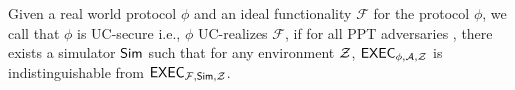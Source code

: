 
\begin{definition} \label{def:uc}
	Given a real world protocol $ \phi $ and an ideal functionality $ \mathcal{F} $ for the protocol $ \phi $, we call that $ \phi $ is UC-secure i.e., $ \phi $ UC-realizes $ \mathcal{F} $, if for all PPT adversaries \adv,  there exists a simulator $ \mathsf{Sim}  $ such that for any environment $ \mathcal{Z} $,
	$\mathsf{EXEC}_{\phi, \mathcal{A}, \mathcal{Z}}$ is indistinguishable from $\mathsf{EXEC}_{\mathcal{F},\mathsf{Sim}, \mathcal{Z}}$.
\end{definition}





